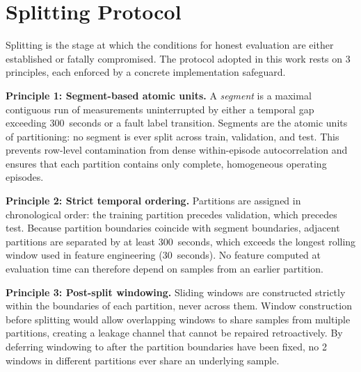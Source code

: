 
\section{Splitting Protocol}
\label{sec:splitting}

Splitting is the stage at which the conditions for honest evaluation are either established or fatally compromised. The protocol adopted in this work rests on 3 principles, each enforced by a concrete implementation safeguard.

\textbf{Principle 1: Segment-based atomic units.} A \emph{segment} is a maximal contiguous run of measurements uninterrupted by either a temporal gap exceeding 300~seconds or a fault label transition. Segments are the atomic units of partitioning: no segment is ever split across train, validation, and test. This prevents row-level contamination from dense within-episode autocorrelation and ensures that each partition contains only complete, homogeneous operating episodes.

\textbf{Principle 2: Strict temporal ordering.} Partitions are assigned in chronological order: the training partition precedes validation, which precedes test. Because partition boundaries coincide with segment boundaries, adjacent partitions are separated by at least 300~seconds, which exceeds the longest rolling window used in feature engineering (30~seconds). No feature computed at evaluation time can therefore depend on samples from an earlier partition.

\textbf{Principle 3: Post-split windowing.} Sliding windows are constructed strictly within the boundaries of each partition, never across them. Window construction before splitting would allow overlapping windows to share samples from multiple partitions, creating a leakage channel that cannot be repaired retroactively. By deferring windowing to after the partition boundaries have been fixed, no 2 windows in different partitions ever share an underlying sample.

